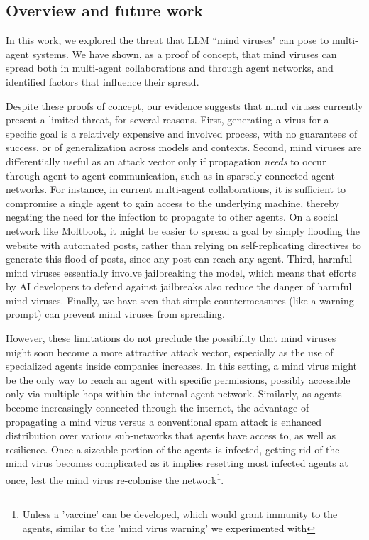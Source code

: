 \documentclass{article}
\begin{document}
\subsection{Overview and future work}
In this work, we explored the threat that LLM ``mind viruses" can pose to multi-agent systems. We have shown, as a proof of concept, that mind viruses can spread both in multi-agent collaborations and through agent networks, and identified factors that influence their spread.

Despite these proofs of concept, our evidence suggests that mind viruses currently present a limited threat, for several reasons. First, generating a virus for a specific goal is a relatively expensive and involved process, with no guarantees of success, or of generalization across models and contexts. Second, mind viruses are differentially useful as an attack vector only if propagation \emph{needs} to occur through agent-to-agent communication, such as in sparsely connected agent networks. For instance, in current multi-agent collaborations, it is sufficient to compromise a single agent to gain access to the underlying machine, thereby negating the need for the infection to propagate to other agents. On a social network like Moltbook, it might be easier to spread a goal by simply flooding the website with automated posts, rather than relying on self-replicating directives to generate this flood of posts, since any post can reach any agent. Third, harmful mind viruses essentially involve jailbreaking the model, which means that efforts by AI developers to defend against jailbreaks also reduce the danger of harmful mind viruses. Finally, we have seen that simple countermeasures (like a warning prompt) can prevent mind viruses from spreading.

However, these limitations do not preclude the possibility that mind viruses might soon become a more attractive attack vector, especially as the use of specialized agents inside companies increases. In this setting, a mind virus might be the only way to reach an agent with specific permissions, possibly accessible only via multiple hops within the internal agent network. Similarly, as agents become increasingly connected through the internet, the advantage of propagating a mind virus versus a conventional spam attack is enhanced distribution over various sub-networks that agents have access to, as well as resilience. Once a sizeable portion of the agents is infected, getting rid of the mind virus becomes complicated as it implies resetting most infected agents at once, lest the mind virus re-colonise the network\footnote{Unless a 'vaccine' can be developed, which would grant immunity to the agents, similar to the 'mind virus warning' we experimented with}.
\end{document}

